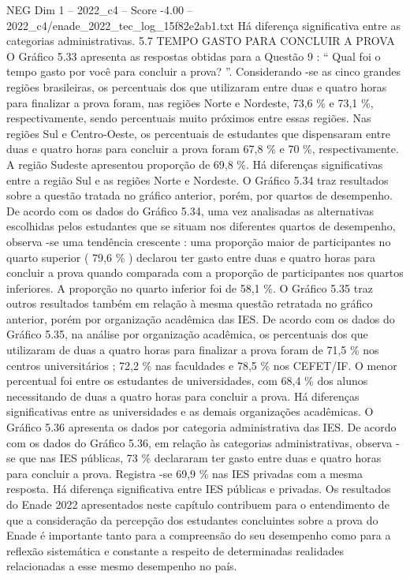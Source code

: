 \begin{textsample}{NEG Dim 1 – 2022\_c4 – Score -4.00 – 2022\_c4/enade\_2022\_tec\_log\_15f82e2ab1.txt}
Há diferença significativa entre as categorias administrativas. 5.7 TEMPO GASTO PARA CONCLUIR A PROVA O Gráfico 5.33 apresenta as respostas obtidas para a Questão 9 : “ Qual foi o tempo gasto por você para concluir a prova? ”.
Considerando -se as cinco grandes regiões brasileiras, os percentuais dos que utilizaram entre duas e quatro horas para finalizar a prova foram, nas regiões Norte e Nordeste, 73,6 \% e 73,1 \%, respectivamente, sendo percentuais muito próximos entre essas regiões.
Nas regiões Sul e Centro-Oeste, os percentuais de estudantes que dispensaram entre duas e quatro horas para concluir a prova foram 67,8 \% e 70 \%, respectivamente.
A região Sudeste apresentou proporção de 69,8 \%.
Há diferenças significativas entre a região Sul e as regiões Norte e Nordeste.
O Gráfico 5.34 traz resultados sobre a questão tratada no gráfico anterior, porém, por quartos de desempenho.
De acordo com os dados do Gráfico 5.34, uma vez analisadas as alternativas escolhidas pelos estudantes que se situam nos diferentes quartos de desempenho, observa -se uma tendência crescente : uma proporção maior de participantes no quarto superior ( 79,6 \% ) declarou ter gasto entre duas e quatro horas para concluir a prova quando comparada com a proporção de participantes nos quartos inferiores.
A proporção no quarto inferior foi de 58,1 \%.
O Gráfico 5.35 traz outros resultados também em relação à mesma questão retratada no gráfico anterior, porém por organização acadêmica das IES.
De acordo com os dados do Gráfico 5.35, na análise por organização acadêmica, os percentuais dos que utilizaram de duas a quatro horas para finalizar a prova foram de 71,5 \% nos centros universitários ; 72,2 \% nas faculdades e 78,5 \% nos CEFET/IF.
O menor percentual foi entre os estudantes de universidades, com 68,4 \% dos alunos necessitando de duas a quatro horas para concluir a prova.
Há diferenças significativas entre as universidades e as demais organizações acadêmicas.
O Gráfico 5.36 apresenta os dados por categoria administrativa das IES.
De acordo com os dados do Gráfico 5.36, em relação às categorias administrativas, observa -se que nas IES públicas, 73 \% declararam ter gasto entre duas e quatro horas para concluir a prova.
Registra -se 69,9 \% nas IES privadas com a mesma resposta.
Há diferença significativa entre IES públicas e privadas.
Os resultados do Enade 2022 apresentados neste capítulo contribuem para o entendimento de que a consideração da percepção dos estudantes concluintes sobre a prova do Enade é importante tanto para a compreensão do seu desempenho como para a reflexão sistemática e constante a respeito de determinadas realidades relacionadas a esse mesmo desempenho no país.

\end{textsample}
